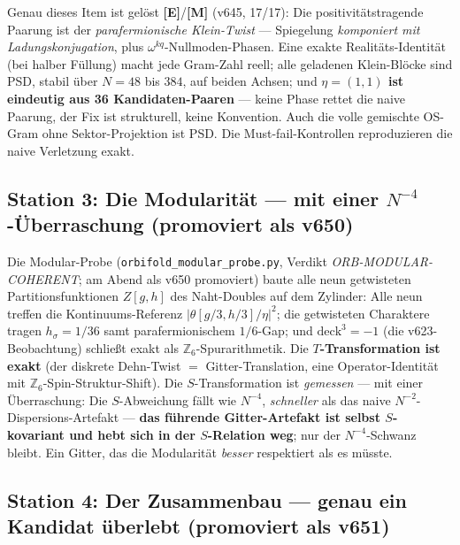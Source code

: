 \documentclass[11pt,a4paper]{article}
\newcommand{\E}{\textcolor{gut}{\textbf{[E]}}}
\newcommand{\M}{\textcolor{mess}{\textbf{[M]}}}
\begin{document}
Genau dieses Item ist gelöst \E{}/\M{} (v645, 17/17): Die
positivitätstragende Paarung ist der \emph{parafermionische
Klein-Twist} --- Spiegelung \emph{komponiert mit
Ladungskonjugation}, plus $\omega^{kq}$-Nullmoden-Phasen. Eine
exakte Realitäts-Identität (bei halber Füllung) macht jede
Gram-Zahl reell; alle geladenen Klein-Blöcke sind PSD, stabil über
$N = 48$ bis $384$, auf beiden Achsen; und \textbf{$\eta = (1,1)$
ist eindeutig aus 36 Kandidaten-Paaren} --- keine Phase rettet die
naive Paarung, der Fix ist strukturell, keine Konvention. Auch die
volle gemischte OS-Gram ohne Sektor-Projektion ist PSD. Die
Must-fail-Kontrollen reproduzieren die naive Verletzung exakt.

\subsection*{Station 3: Die Modularität --- mit einer
$N^{-4}$-Überraschung (promoviert als v650)}

Die Modular-Probe (\texttt{orbifold\_modular\_probe.py}, Verdikt
\emph{ORB-MODULAR-COHERENT}; am Abend als v650 promoviert) baute alle neun getwisteten
Partitionsfunktionen $Z[g,h]$ des Naht-Doubles auf dem Zylinder:
Alle neun treffen die Kontinuums-Referenz
$|\theta[g/3,h/3]/\eta|^2$; die getwisteten Charaktere tragen
$h_\sigma = 1/36$ samt parafermionischem $1/6$-Gap; und
$\mathrm{deck}^3 = -1$ (die v623-Beobachtung) schließt exakt als
$\mathbb{Z}_6$-Spurarithmetik. Die \textbf{$T$-Transformation ist
exakt} (der diskrete Dehn-Twist $=$ Gitter-Translation, eine
Operator-Identität mit $\mathbb{Z}_6$-Spin-Struktur-Shift). Die
$S$-Transformation ist \emph{gemessen} --- mit einer Überraschung:
Die $S$-Abweichung fällt wie $N^{-4}$, \emph{schneller} als das
naive $N^{-2}$-Dispersions-Artefakt --- \textbf{das führende
Gitter-Artefakt ist selbst $S$-kovariant und hebt sich in der
$S$-Relation weg}; nur der $N^{-4}$-Schwanz bleibt. Ein Gitter, das
die Modularität \emph{besser} respektiert als es müsste.

\subsection*{Station 4: Der Zusammenbau --- genau ein Kandidat
überlebt (promoviert als v651)}
\end{document}

